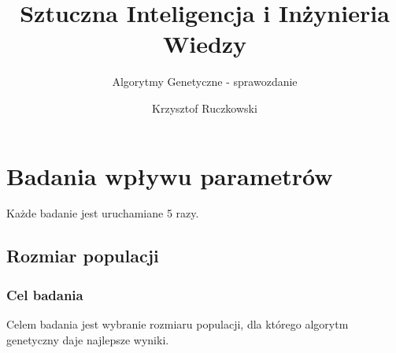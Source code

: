 \documentclass[12pt,a4paper]{article}
\author{Krzysztof Ruczkowski}
\title{Sztuczna Inteligencja i Inżynieria Wiedzy}
\subtitle{Algorytmy Genetyczne - sprawozdanie}
\begin{document}
\maketitle
\tableofcontents
\newpage

\section{Badania wpływu parametrów}
Każde badanie jest uruchamiane 5 razy.
\subsection{Rozmiar populacji}
\subsubsection{Cel badania}
Celem badania jest wybranie rozmiaru populacji, dla którego algorytm genetyczny daje najlepsze wyniki.
\end{document}
